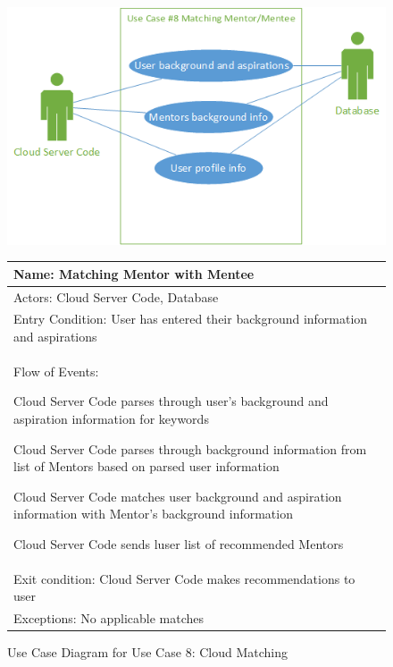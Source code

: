 \documentclass[11pt]{article}
\begin{document}
            \begin{figure}[H]
            \centering
            \includegraphics{UseCase8MatchingMentorMentee}

				\begin{tabular}{|p{12 cm}|}
					\hline
					Name: Matching Mentor with Mentee
					\\ \hline
					Actors: Cloud Server Code, Database
					\\ \hline
					Entry Condition: User has entered their background
					information and aspirations
					\\ \hline
					Flow of Events:
					\begin{enumerate*}
						\item Cloud Server Code parses through user's background
						and aspiration information for keywords
						\item Cloud Server Code parses through background
						information from list of Mentors based on parsed user
						information
						\item Cloud Server Code matches user background and
						aspiration information with Mentor's background
						information
						\item Cloud Server Code sends luser list of recommended
						Mentors
					\end{enumerate*} \\ \hline
					Exit condition: Cloud Server Code makes recommendations to
					user
					\\ \hline
					Exceptions: No applicable matches
					\\ \hline
				\end{tabular}

            \caption{Use Case Diagram for Use Case 8: Cloud Matching}
            \label{UC8}
            \end{figure}
\end{document}
